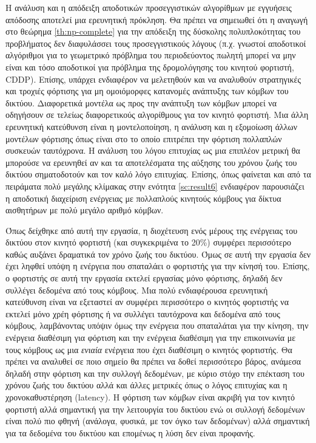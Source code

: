 Η ανάλυση και η απόδειξη αποδοτικών προσεγγιστικών αλγορίθμων με εγγυήσεις απόδοσης αποτελεί μια ερευνητική πρόκληση. Θα πρέπει να σημειωθεί ότι η αναγωγή στο
θεώρημα \ref{th:np-complete} για την απόδειξη της δύσκολης πολυπλοκότητας του προβλήματος δεν διαφυλάσσει τους προσεγγιστικούς λόγους (π.χ. γνωστοί αποδοτικοί
αλγόριθμοι για το γεωμετρικό πρόβλημα του περιοδεύοντος πωλητή μπορεί να μην είναι και τόσο αποδοτικοί για πρόβλημα της δρομολόγησης του κινητού φορτιστή, CDDP).
Επίσης, υπάρχει ενδιαφέρον να μελετηθούν και να αναλυθούν στρατηγικές και τροχιές φόρτισης για μη ομοιόμορφες κατανομές ανάπτυξης των κόμβων του δικτύου. Διαφορετικά
μοντέλα ως προς την ανάπτυξη των κόμβων μπορεί να οδηγήσουν σε τελείως διαφορετικούς αλγορίθμους για τον κινητό φορτιστή. Μια άλλη ερευνητική κατεύθυνση είναι
η μοντελοποίηση, η ανάλυση και η εξομοίωση άλλων μοντέλων φόρτισης όπως είναι στο \cite{multiple_devices} το οποίο επιτρέπει την φόρτιση πολλαπλών συσκευών
ταυτόχρονα. H ανάλυση του λόγου επιτυχίας ως μια επιπλέον μετρική θα μπορούσε να ερευνηθεί αν και τα αποτελέσματα της αύξησης του χρόνου ζωής του δικτύου
σηματοδοτούν και τον καλό λόγο επιτυχίας. Επίσης, όπως φαίνεται και από τα πειράματα πολύ μεγάλης κλίμακας στην ενότητα \ref{sc:result6} ενδιαφέρον παρουσιάζει η
αποδοτική διαχείριση ενέργειας με πολλαπλούς κινητούς κόμβους για δίκτυα αισθητήρων με πολύ μεγάλο αριθμό κόμβων.


Όπως δείχθηκε από αυτή την εργασία, η διοχέτευση ενός μέρους της ενέργειας του δικτύου στον κινητό φορτιστή (και συγκεκριμένα το 20\%) συμφέρει περισσότερο καθώς
αυξάνει δραματικά τον χρόνο ζωής του δικτύου. Όμως σε αυτή την εργασία δεν έχει ληφθεί υπόψη η ενέργεια που σπαταλάει ο φορτιστής για την κίνησή του. Επίσης, ο
φορτιστής σε αυτή την εργασία εκτελεί εργασίας μόνο φόρτισης, δηλαδή δεν συλλέγει δεδομένα από τους κόμβους. Μια πολύ ενδιαφέρουσα ερευνητική κατεύθυνση είναι να
εξεταστεί αν συμφέρει περισσότερο ο κινητός φορτιστής να εκτελεί μόνο χρέη φόρτισης ή να συλλέγει ταυτόχρονα και δεδομένα από τους κόμβους, λαμβάνοντας υπόψιν όμως
την ενέργεια που σπαταλάται για την κίνηση, την ενέργεια διαθέσιμη για φόρτιση και την ενέργεια διαθέσιμη για την επικοινωνία με τους κόμβους ως μια \emph{ενιαία}
ενέργεια που έχει διαθέσιμη ο κινητός φορτιστής. Θα πρέπει να αναλυθεί σε ποιο σημείο θα πρέπει να δοθεί περισσότερο βάρος, ανάμεσα δηλαδή στην φόρτιση και την
συλλογή δεδομένων, με κύριο στόχο την επέκταση του χρόνου ζωής του δικτύου αλλά και άλλες μετρικές όπως ο λόγος επιτυχίας και η χρονοκαθυστέρηση (latency). Η φόρτιση
των κόμβων είναι ακριβή για τον κινητό φορτιστή αλλά σημαντική για την λειτουργία του δικτύου ενώ οι συλλογή δεδομένων είναι πολύ πιο φθηνή (ανάλογα, φυσικά, με τον
όγκο των δεδομένων) αλλά σημαντική για τα δεδομένα του δικτύου και επομένως η λύση δεν είναι προφανής.
